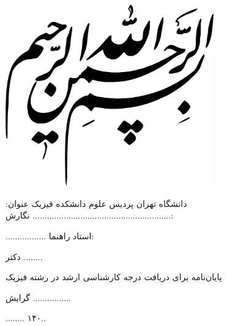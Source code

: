 \documentclass[a4paper,oneside]{book}
\begin{document}
\newpage
	\thispagestyle{empty}
	\vspace*{50mm}
	\begin{center}
		\includegraphics[width=90mm]{./default_pics/besm.png}
	\end{center}
	\newpage
	\thispagestyle{empty}
	\begin{center}

		
		\vspace{0.5cm}
		{\Huge دانشگاه تهران}
		\linebreak
		\linebreak
		{\huge پردیس علوم}
		\linebreak
		\linebreak
		{\LARGE دانشکده فیزیک}
		\linebreak
		\linebreak
		\linebreak
		\linebreak	
			\vspace{0.5cm}
		{\LARGE عنوان:}
				\linebreak
		{\LARGE
			..........................................................}
		\linebreak
		\linebreak
		\linebreak
		\linebreak
		{\LARGE نگارش:}
					\vspace{0.5cm}
					
		{\LARGE .................}
		\linebreak
		\linebreak
		\linebreak
		\linebreak
		{\LARGE استاد راهنما:}
		
		{\LARGE دکتر ........}
		\linebreak
		\linebreak
		\linebreak
		{\LARGE پایان‌نامه برای دریافت درجه کارشناسی ارشد در رشته فیزیک
			
			گرایش ................}
		\linebreak
		\linebreak
		\linebreak
		\linebreak
		\linebreak
		\linebreak
		{\LARGE ........ ۱۴۰..}
	\end{center}
\end{document}

